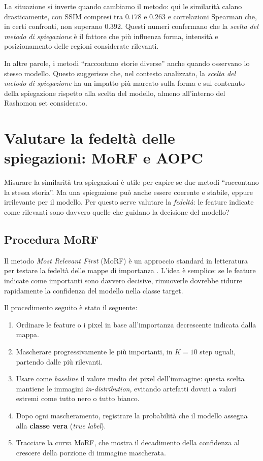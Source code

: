 \documentclass{article}
\begin{document}
La situazione si inverte quando cambiamo il metodo: qui le similarità calano
drasticamente, con SSIM compresi tra $0.178$ e $0.263$ e correlazioni Spearman
che, in certi confronti, non superano $0.392$. Questi numeri confermano che la
\emph{scelta del metodo di spiegazione} è il fattore che più influenza forma,
intensità e posizionamento delle regioni considerate rilevanti.

In altre parole, i metodi “raccontano storie diverse” anche quando osservano lo
stesso modello. Questo suggerisce che, nel contesto analizzato, la \emph{scelta
      del metodo di spiegazione} ha un impatto più marcato sulla forma e sul
contenuto della spiegazione rispetto alla scelta del modello, almeno
all’interno del Rashomon set considerato.

\section{Valutare la fedeltà delle spiegazioni: MoRF e AOPC}

Misurare la similarità tra spiegazioni è utile per capire se due metodi
``raccontano la stessa storia''. Ma una spiegazione può anche essere coerente e
stabile, eppure irrilevante per il modello. Per questo serve valutare la
\emph{fedeltà}: le feature indicate come rilevanti sono davvero quelle che
guidano la decisione del modello?

\subsection{Procedura MoRF}
Il metodo \emph{Most Relevant First} (MoRF) è un approccio standard in
letteratura per testare la fedeltà delle mappe di importanza
\citep{samek2016evaluating,samek2017explainable}. L’idea è semplice: se le
feature indicate come importanti sono davvero decisive, rimuoverle dovrebbe
ridurre rapidamente la confidenza del modello nella classe target.

Il procedimento seguito è stato il seguente:
\begin{enumerate}
      \item Ordinare le feature o i pixel in base all’importanza decrescente indicata dalla
            mappa.
      \item Mascherare progressivamente le più importanti, in $K=10$ step uguali, partendo
            dalle più rilevanti.
      \item Usare come \emph{baseline} il valore medio dei pixel dell’immagine: questa
            scelta mantiene le immagini \emph{in-distribution}, evitando artefatti dovuti a
            valori estremi come tutto nero o tutto bianco.
      \item Dopo ogni mascheramento, registrare la probabilità che il modello assegna alla
            \textbf{classe vera} (\textit{true label}).
      \item Tracciare la curva MoRF, che mostra il decadimento della confidenza al crescere
            della porzione di immagine mascherata.
\end{enumerate}
\end{document}
